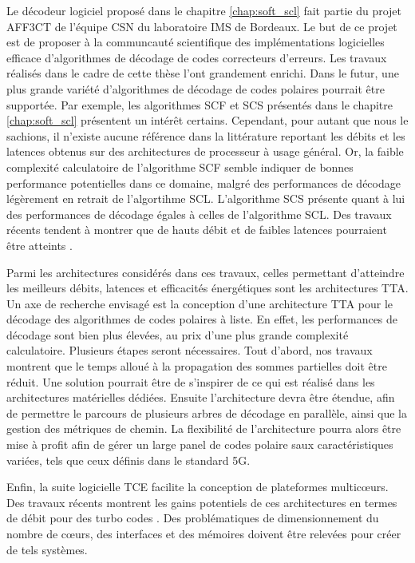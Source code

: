Le décodeur logiciel proposé dans le chapitre \ref{chap:soft_scl} fait partie du projet AFF3CT de l'équipe CSN du laboratoire IMS de Bordeaux. Le but de ce projet est de proposer à la communcauté scientifique des implémentations logicielles efficace d'algorithmes de décodage de codes correcteurs d'erreurs. Les travaux réalisés dans le cadre de cette thèse l'ont grandement enrichi. Dans le futur, une plus grande variété d'algorithmes de décodage de codes polaires pourrait être supportée. Par exemple, les algorithmes SCF et SCS présentés dans le chapitre \ref{chap:soft_scl} présentent un intérêt certains. Cependant, pour autant que nous le sachions, il n'existe aucune référence dans la littérature reportant les débits et les latences obtenus sur des architectures de processeur à usage général. Or, la faible complexité calculatoire de l'algorithme SCF semble indiquer de bonnes performance potentielles dans ce domaine, malgré des performances de décodage légèrement en retrait de l'algortihme SCL. L'algorithme SCS présente quant à lui des performances de décodage égales à celles de l'algorithme SCL. Des travaux récents tendent à montrer que de hauts débit et de faibles latences pourraient être atteints \cite{8351832}.

Parmi les architectures considérés dans ces travaux, celles permettant d'atteindre les meilleurs débits, latences et efficacités énergétiques sont les architectures TTA. Un axe de recherche envisagé est la conception d'une architecture TTA pour le décodage des algorithmes de codes polaires à liste. En effet, les performances de décodage sont bien plus élevées, au prix d'une plus grande complexité calculatoire. Plusieurs étapes seront nécessaires. Tout d'abord, nos travaux montrent que le temps alloué à la propagation des sommes partielles doit être réduit. Une solution pourrait être de s'inspirer de ce qui est réalisé dans les architectures matérielles dédiées. Ensuite l'architecture devra être étendue, afin de permettre le parcours de plusieurs arbres de décodage en parallèle, ainsi que la gestion des métriques de chemin. La flexibilité de l'architecture pourra alors être mise à profit afin de gérer un large panel de codes polaire saux caractéristiques variées, tels que ceux définis dans le standard 5G.

Enfin, la suite logicielle TCE facilite la conception de plateformes multicœurs. Des travaux récents montrent les gains potentiels de ces architectures en termes de débit pour des turbo codes \cite{}. Des problématiques de dimensionnement du nombre de cœurs, des interfaces et des mémoires doivent être relevées pour créer de tels systèmes.